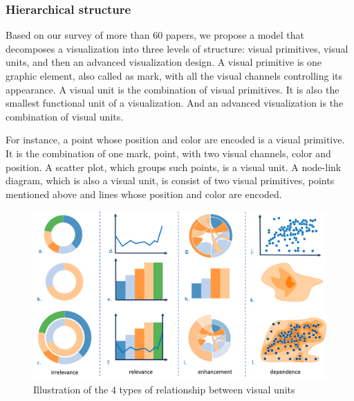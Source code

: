\documentclass[review,journal]{vgtc}         %
\begin{document}
\subsubsection{Hierarchical structure}
Based on our survey of more than 60 papers, we propose a model that decomposes a visualization into three levels of structure: visual primitives, visual units, and then an advanced visualization design. A visual primitive is one graphic element, also called as mark\cite{munzner_visualization_2014}, with all the visual channels controlling its appearance. A visual unit is the combination of visual primitives. It is also the smallest functional unit of a visualization.  And an advanced visualization is the combination of visual units. \par
For instance, a point whose position and color are encoded is a visual primitive. It is the combination of one mark, point, with two visual channels, color and position. A scatter plot, which groups such points, is a visual unit. A node-link diagram, which is also a visual unit, is consist of two visual primitives, points mentioned above and lines whose position and color are encoded. \par
\begin{figure}[tb]
 \centering %
 \includegraphics[width=\columnwidth]{unit_relationship}
 \caption{Illustration of the 4 types of relationship between visual units}
 \label{fig:sample}
\end{figure}
\end{document}
